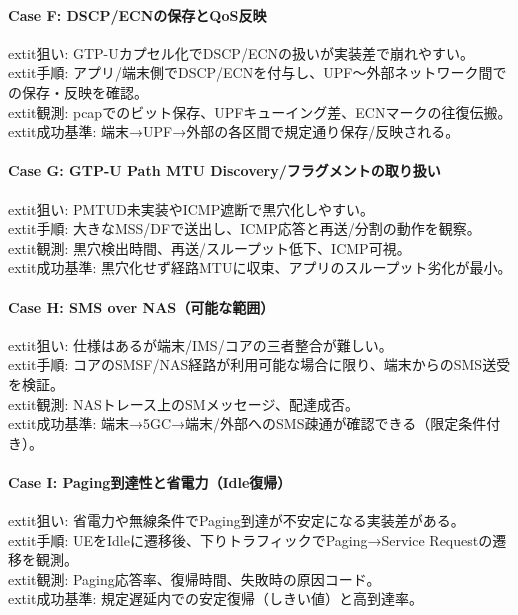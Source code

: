 \paragraph{Case F: DSCP/ECNの保存とQoS反映}
	extit{狙い}: GTP-Uカプセル化でDSCP/ECNの扱いが実装差で崩れやすい。\\
	extit{手順}: アプリ/端末側でDSCP/ECNを付与し、UPF～外部ネットワーク間での保存・反映を確認。\\
	extit{観測}: pcapでのビット保存、UPFキューイング差、ECNマークの往復伝搬。\\
	extit{成功基準}: 端末→UPF→外部の各区間で規定通り保存/反映される。

\paragraph{Case G: GTP-U Path MTU Discovery/フラグメントの取り扱い}
	extit{狙い}: PMTUD未実装やICMP遮断で黒穴化しやすい。\\
	extit{手順}: 大きなMSS/DFで送出し、ICMP応答と再送/分割の動作を観察。\\
	extit{観測}: 黒穴検出時間、再送/スループット低下、ICMP可視。\\
	extit{成功基準}: 黒穴化せず経路MTUに収束、アプリのスループット劣化が最小。

\paragraph{Case H: SMS over NAS（可能な範囲）}
	extit{狙い}: 仕様はあるが端末/IMS/コアの三者整合が難しい。\\
	extit{手順}: コアのSMSF/NAS経路が利用可能な場合に限り、端末からのSMS送受を検証。\\
	extit{観測}: NASトレース上のSMメッセージ、配達成否。\\
	extit{成功基準}: 端末→5GC→端末/外部へのSMS疎通が確認できる（限定条件付き）。

\paragraph{Case I: Paging到達性と省電力（Idle復帰）}
	extit{狙い}: 省電力や無線条件でPaging到達が不安定になる実装差がある。\\
	extit{手順}: UEをIdleに遷移後、下りトラフィックでPaging→Service Requestの遷移を観測。\\
	extit{観測}: Paging応答率、復帰時間、失敗時の原因コード。\\
	extit{成功基準}: 規定遅延内での安定復帰（しきい値）と高到達率。

